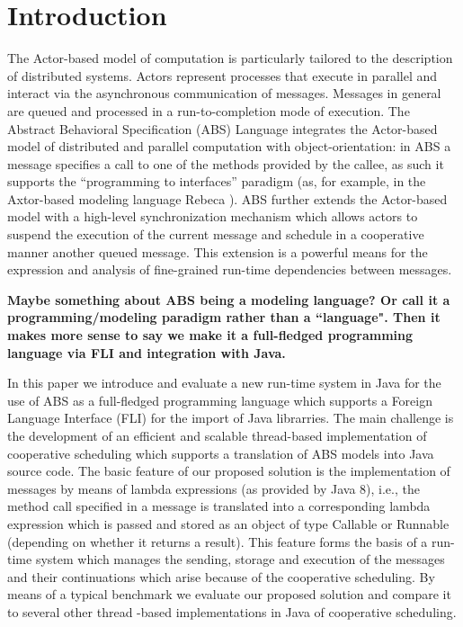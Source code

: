 \section{Introduction}

The Actor-based model of computation \cite{Agha} is particularly tailored to the description of distributed systems.  Actors represent processes that execute in parallel and interact via the asynchronous communication of messages.
Messages in general are queued and processed in a run-to-completion mode of execution.
The  Abstract Behavioral Specification (ABS) \cite{abs}  Language  integrates the Actor-based model of distributed and parallel computation with object-orientation:
in ABS a message specifies a  call to one of the methods provided by the callee,
as such it supports the ``programming to interfaces'' paradigm (as, for example, in the Axtor-based modeling language Rebeca \cite{Sirjani}).
ABS further  extends the Actor-based model with  a high-level synchronization mechanism which allows actors to suspend the
execution of the current message and schedule in a cooperative manner another
queued message.  This  extension  is a powerful means for the expression and analysis
of fine-grained run-time dependencies between messages.

{\bfseries
Maybe something about ABS being a modeling language? 
Or call it a programming/modeling paradigm rather than a ``language".
Then it makes more sense to say we make it a full-fledged programming language via FLI and integration with Java.
}

In this paper we introduce  and evaluate a new run-time system in Java for  the use of ABS as a full-fledged programming language which supports a Foreign Language Interface (FLI) for the import of Java librarries. The main challenge is the development of an efficient and scalable  thread-based implementation of cooperative scheduling
which supports a translation of ABS models into Java source code.
The basic feature of our proposed solution is the implementation of messages by means of
lambda expressions (as provided by Java 8), i.e., the method call specified in a message
is translated into a corresponding lambda expression which is passed and stored as
an object of type Callable or Runnable (depending on whether it returns  a result).
This  feature forms  the basis of a run-time system which manages
the sending, storage and execution of  the messages and their continuations
which arise because of the cooperative scheduling.
By means of a typical benchmark we evaluate our proposed solution and compare it
to several other thread -based implementations in Java of cooperative scheduling.

